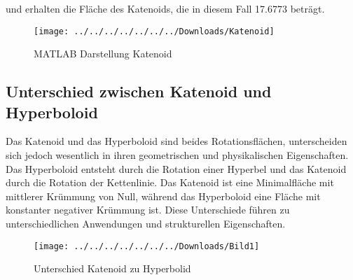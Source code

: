 und erhalten die Fläche des Katenoids, die in diesem Fall 17.6773 beträgt.


\begin{figure}
	\centering
	\texttt{[image: ../../../../../../../Downloads/Katenoid]}
	\caption{MATLAB Darstellung Katenoid}
	\label{fig:katenoid}
\end{figure}

\subsection{Unterschied zwischen Katenoid und Hyperboloid
	\label{Das Katenoid:subsection:Unterschied zwischen Katenoid und Hyperboloid}}
Das Katenoid und das Hyperboloid sind beides Rotationsflächen, unterscheiden sich jedoch wesentlich in ihren geometrischen und physikalischen Eigenschaften.
Das Hyperboloid entsteht durch die Rotation einer Hyperbel und das Katenoid durch die Rotation der Kettenlinie. 
Das Katenoid ist eine Minimalfläche mit mittlerer Krümmung von Null, während das Hyperboloid eine Fläche mit konstanter negativer Krümmung ist.
Diese Unterschiede führen zu unterschiedlichen Anwendungen und strukturellen Eigenschaften.
\begin{figure}
	\centering
	\texttt{[image: ../../../../../../../Downloads/Bild1]}
	\caption{Unterschied Katenoid zu Hyperbolid}
	\label{fig:bild1}
\end{figure}

